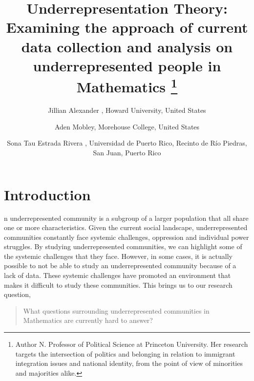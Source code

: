 \documentclass[autowc]{CUP-JNL-PPS}
\begin{document}
\begin{Frontmatter}
\title[Underrepresentation Theory]{
Underrepresentation Theory: Examining the approach of current data collection and analysis on underrepresented people in Mathematics
\thanks{
    Author N.  Professor of Political Science at Princeton University.
    Her research targets the intersection of politics and belonging in relation to immigrant integration issues and national identity, from the point of view of minorities and majorities alike.
}
}

\author{Jillian Alexander , Howard University, United States}
\author{Aden Mobley, Morehouse College, United States}
\author{Sona Tau Estrada Rivera , Universidad de Puerto Rico, Recinto de R\'{i}o Piedras, San Juan, Puerto Rico}


\end{Frontmatter}

\onecolumn{}

\section{Introduction}

n underrepresented community is a subgroup of a larger population that all share one or more characteristics.
Given the current social landscape, underrepresented communities constantly face systemic challenges, oppression and individual power struggles.
By studying underrepresented communities, we can highlight some of the systemic challenges that they face.
However, in some cases, it is actually possible to not be able to study an underrepresented community because of a lack of data.
These systemic challenges have promoted an environment that makes it difficult to study these communities.
This brings us to our research question,
\begin{quote}
    What questions surrounding underrepresented communities in Mathematics are currently hard to answer?
\end{quote}
\end{document}
